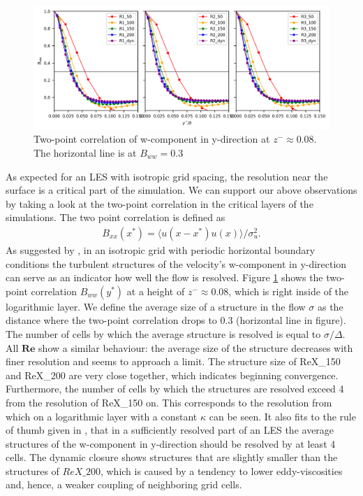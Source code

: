 \documentclass[a4paper,11pt]{article}
\newcommand{\RE}{\mathbf{Re}}
\begin{document}
\begin{figure}[ht]
  \centerline{
	\includegraphics[width=\textwidth]{figures_2024/d3y_2pc_ww_3Re_0.079.png}
}
  \caption{Two-point correlation of w-component in y-direction at $z^-\approx 0.08$. The horizontal line is at $B_{ww}=0.3$}
  \label{2pc_008}
\end{figure}

As expected for an LES with isotropic grid spacing, the resolution near the surface is a critical part of the simulation. We can support our above observations by taking a look at the two-point correlation in the critical layers of the simulations. The two point correlation is defined as 
\begin{align}
  B_{xx}\left(x^*\right) = \langle u\left(x-x^*\right)u\left(x\right)\rangle/\sigma_u^2.
\end{align}
As suggested by \cite{wurps2020grid}, in an isotropic grid with periodic horizontal boundary conditions the turbulent structures of the velocity's w-component in y-direction can serve as an indicator how well the flow is resolved. Figure \ref{2pc_008} shows the two-point correlation $B_{ww}(y^*)$ at a height of $z^-\approx 0.08$, which is right inside of the logarithmic layer. We define the average size of a structure in the flow $\sigma$ as the distance where the two-point correlation drops to 0.3 (horizontal line in figure). The number of cells by which the average structure is resolved is equal to $\sigma/\Delta$. All $\RE$ show a similar behaviour: the average size of the structure decreases with finer resolution and seems to approach a limit. The structure size of ReX\_150 and ReX\_200 are very close together, which indicates beginning convergence. Furthermore, the number of cells by which the structures are resolved exceed 4 from the resolution of ReX\_150 on. This corresponds to the resolution from which on a logarithmic layer with a constant $\kappa$ can be seen. It also fits to the rule of thumb given in \cite{wurps2020grid}, that in a sufficiently resolved part of an LES the average structures of the w-component in y-direction should be resolved by at least 4 cells. The dynamic closure shows structures that are slightly smaller than the structures of $ReX\_200$, which is caused by a tendency to lower eddy-viscosities and, hence, a weaker coupling of neighboring grid cells.
\end{document}
